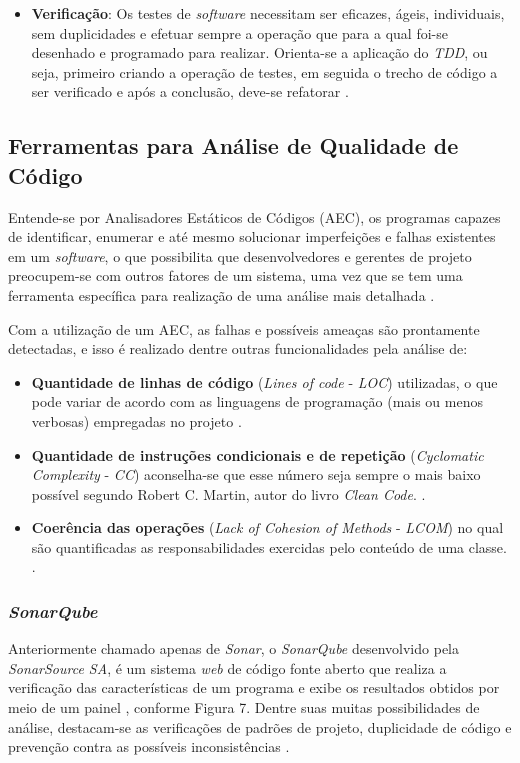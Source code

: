 \begin{itemize}
\item{\textbf{Verificação}}:
Os testes de \textit{software} necessitam ser eficazes, ágeis, individuais, sem duplicidades e efetuar sempre a operação que para a qual foi-se desenhado e programado para realizar. Orienta-se a aplicação do \textit{TDD}, ou seja, primeiro criando a operação de testes, em seguida o trecho de código a ser verificado e após a conclusão, deve-se refatorar \cite{ZanetteBeCodeCleanCode2017}.

\end{itemize}

\subsection{Ferramentas para Análise de Qualidade de Código}

Entende-se por Analisadores Estáticos de Códigos (AEC), os programas capazes de identificar, enumerar e até mesmo solucionar imperfeições e falhas existentes em um \textit{software}, o que possibilita que desenvolvedores e gerentes de projeto preocupem-se com outros fatores de um sistema, uma vez que se tem uma ferramenta específica para realização de uma análise mais detalhada \cite{AECMedium2018}. 

Com a utilização de um AEC, as falhas e possíveis ameaças são prontamente detectadas, e isso é realizado dentre outras funcionalidades pela análise de:

\begin{itemize}
    \item \textbf{Quantidade de linhas de código} (\textit{Lines of code} - \textit{LOC}) utilizadas, o que pode variar de acordo com as linguagens de programação (mais ou menos verbosas) empregadas no projeto \cite{DevQA}.
    
    \item {\textbf{Quantidade de instruções condicionais e de repetição} (\textit{Cyclomatic Complexity} - \textit{CC}) aconselha-se que esse número seja sempre o mais baixo possível segundo Robert C. Martin, autor do livro \textit{Clean Code}. \cite{DevQA}.}
    
    \item{\textbf{Coerência das operações} (\textit{Lack of Cohesion of Methods} - \textit{LCOM}) no qual são quantificadas as responsabilidades exercidas pelo conteúdo de uma classe. \cite{DevQA}.}
\end{itemize}

\subsubsection{\textit{SonarQube}}
Anteriormente chamado apenas de \textit{Sonar}, o \textit{SonarQube} desenvolvido pela \textit{SonarSource SA}, é um sistema \textit{web} de código fonte aberto que realiza a verificação das características de um programa e exibe os resultados obtidos por meio de um painel \cite{AECMedium2018}, conforme Figura 7. Dentre suas muitas possibilidades de análise, destacam-se as verificações de padrões de projeto, duplicidade de código e prevenção contra as possíveis inconsistências \cite{DevQA}.

